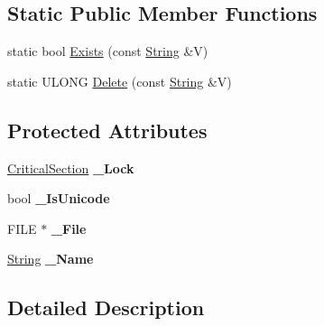 \subsection*{Static Public Member Functions}
\begin{DoxyCompactItemize}
\item 
static bool \hyperlink{class_canberra_1_1_utility_1_1_core_1_1_file_a255660e688ccaf7b56b9da31a3f09eea_a255660e688ccaf7b56b9da31a3f09eea}{Exists} (const \hyperlink{class_canberra_1_1_utility_1_1_core_1_1_string}{String} \&V)
\item 
static U\+L\+O\+NG \hyperlink{class_canberra_1_1_utility_1_1_core_1_1_file_a21294a585475929cf9c68a165816b7a7_a21294a585475929cf9c68a165816b7a7}{Delete} (const \hyperlink{class_canberra_1_1_utility_1_1_core_1_1_string}{String} \&V)
\end{DoxyCompactItemize}
\subsection*{Protected Attributes}
\begin{DoxyCompactItemize}
\item 
\mbox{\label{class_canberra_1_1_utility_1_1_core_1_1_file_a6f67f7df2d5623f56b2f0108b43dde41}} 
\hyperlink{class_canberra_1_1_utility_1_1_core_1_1_critical_section}{Critical\+Section} {\bfseries \+\_\+\+Lock}
\item 
\mbox{\label{class_canberra_1_1_utility_1_1_core_1_1_file_a0ab04f6e5ac5b96f2886bbd4dde968ed}} 
bool {\bfseries \+\_\+\+Is\+Unicode}
\item 
\mbox{\label{class_canberra_1_1_utility_1_1_core_1_1_file_abc6a2d385f3c28fe00dde8afbbe45609}} 
F\+I\+LE $\ast$ {\bfseries \+\_\+\+File}
\item 
\mbox{\label{class_canberra_1_1_utility_1_1_core_1_1_file_aaf0a617ed260fb16b99fe31e89505a69}} 
\hyperlink{class_canberra_1_1_utility_1_1_core_1_1_string}{String} {\bfseries \+\_\+\+Name}
\end{DoxyCompactItemize}


\subsection{Detailed Description}


